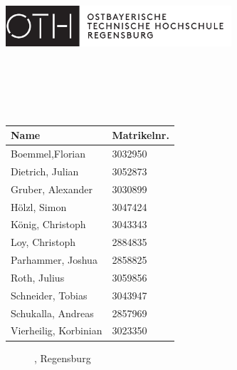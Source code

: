 \begin{titlepage}
	\includegraphics[height=1.5cm]{Logo/oth_logo_neu.eps}
	\vspace{1cm}
	\begin{center}       
        \spacedallcaps{\small{\myUni}} \\
        \spacedallcaps{\small{\myFaculty}} \\ \vspace*{2\baselineskip}
		\Large     
        \begingroup
        	 \\ \vspace*{2\baselineskip}
            \textbf{\myTitle} \\
        \endgroup
        \large
        \vspace*{10\baselineskip}
	   	\begin{table}[h]
        \centering
        \begin{tabular}{|l|l|}
        \hline
        \textbf{Name} & \textbf{Matrikelnr.} \\
        \hline
        Boemmel,Florian & 3032950 \\
        \hline
        Dietrich, Julian & 3052873\\
        \hline
        Gruber, Alexander & 3030899 \\
        \hline
        Hölzl, Simon & 3047424 \\
        \hline
        König, Christoph & 3043343 \\
        \hline
        Loy, Christoph & 2884835\\
        \hline
        Parhammer, Joshua & 2858825\\
        \hline
        Roth, Julius &3059856 \\
        \hline
        Schneider, Tobias & 3043947 \\
        \hline
        Schukalla, Andreas & 2857969\\
        \hline
        Vierheilig, Korbinian & 3023350\\
        \hline
        \end{tabular}
	   	
	   	\end{table}
    	
    	\begin{figure}[b]
    		\begin{center}
		    	\myTime, Regensburg
	    	\end{center}
    	\end{figure}
    \end{center}
\end{titlepage}   